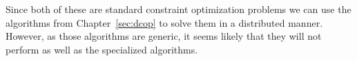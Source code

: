 Since both of these are standard constraint optimization problems we
can use the algorithms from Chapter~\ref{sec:dcop} to solve them in a
distributed manner.  However, as those algorithms are generic, it
seems likely that they will not perform as well as the specialized
algorithms.








